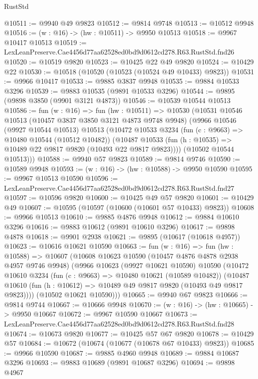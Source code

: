 \begin{lexlean}{RustStd}
\begin{coremodule}
@10511 := @9940 @49 @9823
@10512 := @9814 @9748
@10513 := @10512 @9948
@10516 := (w : @16) -> (hw : @10511) -> @9950 @10513
@10518 := @9967 @10417 @10513
@10519 := LexLeanPreserve.Cae4456d77aa62528ed0bd9d0612cd278.R63.RustStd.fnd26
@10520 := @10519 @9820
@10523 := @10425 @22 @49 @9820
@10524 := @10429 @22
@10530 := @10518 (@10520 (@10523 (@10524 @49 @10433) @9823))
@10531 := @9966 @10417
@10533 := @9885 @3837 @9948
@10535 := @9884 @10533 @3296
@10539 := @9883 @10535 (@9891 @10533 @3296)
@10544 := @9895 (@9898 @3850 (@9901 @3121 @4873))
@10546 := @10539 @10544 @10513
@10586 := fun (w : @16) =>
  fun (hw : @10511) =>
  @10530
    (@10531
      @10546
      @10513
      (@10457 @3837 @3850 @3121 @4873 @9748 @9948)
      (@9966
        @10546
        (@9927 @10544 @10513)
        @10513
        (@10472
          @10533
          @3234
          (fun (c : @9663) => @10480 @10544 (@10512 @10482))
          (@10487 @10533 (fun (h : @10535) => @10489 @22 @9817 @9820 (@10493 @22 @9817 @9823))))
        (@10502 @10544 @10513)))
@10588 := @9940 @57 @9823
@10589 := @9814 @9746
@10590 := @10589 @9948
@10593 := (w : @16) -> (hw : @10588) -> @9950 @10590
@10595 := @9967 @10513 @10590
@10596 := LexLeanPreserve.Cae4456d77aa62528ed0bd9d0612cd278.R63.RustStd.fnd27
@10597 := @10596 @9820
@10600 := @10425 @49 @57 @9820
@10601 := @10429 @49
@10607 := @10595 (@10597 (@10600 (@10601 @57 @10433) @9823))
@10608 := @9966 @10513
@10610 := @9885 @4876 @9948
@10612 := @9884 @10610 @3296
@10616 := @9883 @10612 (@9891 @10610 @3296)
@10617 := @9898 @4878
@10618 := @9901 @2938
@10621 := @9895 (@10617 (@10618 @4957))
@10623 := @10616 @10621 @10590
@10663 := fun (w : @16) =>
  fun (hw : @10588) =>
  @10607
    (@10608
      @10623
      @10590
      (@10457 @4876 @4878 @2938 @4957 @9746 @9948)
      (@9966
        @10623
        (@9927 @10621 @10590)
        @10590
        (@10472
          @10610
          @3234
          (fun (c : @9663) => @10480 @10621 (@10589 @10482))
          (@10487 @10610 (fun (h : @10612) => @10489 @49 @9817 @9820 (@10493 @49 @9817 @9823))))
        (@10502 @10621 @10590)))
@10665 := @9940 @67 @9823
@10666 := @9814 @9744
@10667 := @10666 @9948
@10670 := (w : @16) -> (hw : @10665) -> @9950 @10667
@10672 := @9967 @10590 @10667
@10673 := LexLeanPreserve.Cae4456d77aa62528ed0bd9d0612cd278.R63.RustStd.fnd28
@10674 := @10673 @9820
@10677 := @10425 @57 @67 @9820
@10678 := @10429 @57
@10684 := @10672 (@10674 (@10677 (@10678 @67 @10433) @9823))
@10685 := @9966 @10590
@10687 := @9885 @4960 @9948
@10689 := @9884 @10687 @3296
@10693 := @9883 @10689 (@9891 @10687 @3296)
@10694 := @9898 @4967

\end{coremodule}
\end{lexlean}
